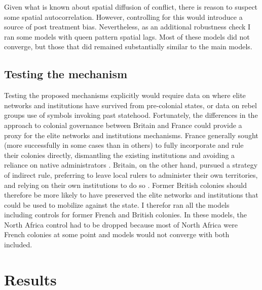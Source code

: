 \documentclass[12pt]{article}
\begin{document}
Given what is known about spatial diffusion of conflict, there is reason to
suspect some spatial autocorrelation. However, controlling for this would
introduce a source of post treatment bias. Nevertheless, as an additional
robustness check I ran some models with queen pattern spatial lags. Most of
these models did not converge, but those that did remained substantially similar
to the main models.

\subsection{Testing the mechanism} \label{Testing the mechanism}

Testing the proposed mechanisms explicitly would require data on where elite
networks and institutions have survived from pre-colonial states, or data on
rebel groups use of symbols invoking past statehood. Fortunately, the
differences in the approach to colonial governance between Britain and France
could provide a proxy for the elite networks and institutions mechanisms. France
generally sought (more successfully in some cases than in others) to fully
incorporate and rule their colonies directly, dismantling the
existing institutions and avoiding a reliance on native
administrators \citep{Blanton_2001}. Britain, on the other hand, pursued a
strategy of indirect rule, preferring to leave local rulers to administer their
own territories, and relying on their own institutions to do so
\citep{Blanton_2001}. Former British colonies should therefore be more likely to
have preserved the elite networks and institutions that could be used to
mobilize against the state. I therefor ran all the models including controls for
former French and British colonies. In these models, the North Africa control
had to be dropped because most of North Africa were French colonies at some
point and models would not converge with both included. 

\section{Results} \label{Results}
\end{document}
